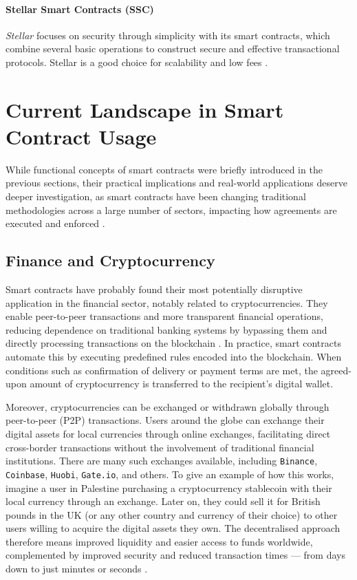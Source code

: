 \paragraph{Stellar Smart Contracts (SSC)}

\textit{Stellar} focuses on security through simplicity with its smart contracts, which combine several basic operations to construct secure and effective transactional protocols. Stellar is a good choice for scalability and low fees \cite{MokdadEtAl2022}.

\section{Current Landscape in Smart Contract Usage}

While functional concepts of smart contracts were briefly introduced in the previous sections, their practical implications and real-world applications deserve deeper investigation, as smart contracts have been changing traditional methodologies across a large number of sectors, impacting how agreements are executed and enforced \cite{MagazzeniEtAl2017}.

\subsection{Finance and Cryptocurrency}

Smart contracts have probably found their most potentially disruptive application in the financial sector, notably related to cryptocurrencies. They enable peer-to-peer transactions and more transparent financial operations, reducing dependence on traditional banking systems \cite{AlmahirahEtAl2021, MagazzeniEtAl2017} by bypassing them and directly processing transactions on the blockchain \cite{Smith2020}. In practice, smart contracts automate this by executing predefined rules encoded into the blockchain. When conditions such as confirmation of delivery or payment terms are met, the agreed-upon amount of cryptocurrency is transferred to the recipient’s digital wallet.

Moreover, cryptocurrencies can be exchanged or withdrawn globally through peer-to-peer (P2P) transactions. Users around the globe can exchange their digital assets for local currencies through online exchanges, facilitating direct cross-border transactions without the involvement of traditional financial institutions. There are many such exchanges available, including \texttt{Binance}, \texttt{Coinbase}, \texttt{Huobi}, \texttt{Gate.io}, and others. To give an example of how this works, imagine a user in Palestine purchasing a cryptocurrency stablecoin with their local currency through an exchange. Later on, they could sell it for British pounds in the UK (or any other country and currency of their choice) to other users willing to acquire the digital assets they own. The decentralised approach therefore means improved liquidity and easier access to funds worldwide, complemented by improved security and reduced transaction times — from days down to just minutes or seconds \cite{DelgadoSeguraEtAl2018}.

